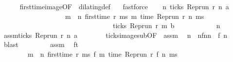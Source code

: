 \begin{isabellebody}
\ \ \ \ \isamarkupfalse%
\ first{\isacharunderscore}time{\isacharunderscore}image{\isacharbrackleft}OF\ {\isacharasterisk}{\isacharbrackright}\ dilating{\isacharunderscore}def\ {\isacharasterisk}\ \isamarkupfalse%
\ fastforce\isanewline
\ \ \isamarkupfalse%
\ {\isacartoucheopen}{\isasymforall}n{\isachardot}\ ticks\ {\isacharparenleft}{\isacharparenleft}Rep{\isacharunderscore}run\ r{\isacharparenright}\ n\ a{\isacharparenright}\isanewline
\ \ \ \ \ \ \ \ \ \ \ \ \ \ \ \ \ \ {\isasymlongrightarrow}\ {\isacharparenleft}{\isasymforall}m\ {\isasymge}\ n{\isachardot}\ first{\isacharunderscore}time\ r\ ms\ m\ {\isacharparenleft}time\ {\isacharparenleft}{\isacharparenleft}Rep{\isacharunderscore}run\ r{\isacharparenright}\ n\ ms{\isacharparenright}\ {\isacharplus}\ {\isasymdelta}{\isasymtau}{\isacharparenright}\isanewline
\ \ \ \ \ \ \ \ \ \ \ \ \ \ \ \ \ \ \ \ \ \ \ \ \ \ \ \ \ \ \ \ {\isasymlongrightarrow}\ ticks\ {\isacharparenleft}{\isacharparenleft}Rep{\isacharunderscore}run\ r{\isacharparenright}\ m\ b{\isacharparenright}{\isacharparenright}{\isacartoucheclose}\isanewline
\ \ \isamarkupfalse%
\ {\isacharminus}\isanewline
\ \ \ \ \isacommand{{\isacharbraceleft}}\isamarkupfalse%
\ \isamarkupfalse%
\ n\ \isamarkupfalse%
\ assm{\isacharcolon}{\isacartoucheopen}ticks\ {\isacharparenleft}{\isacharparenleft}Rep{\isacharunderscore}run\ r{\isacharparenright}\ n\ a{\isacharparenright}{\isacartoucheclose}\isanewline
\ \ \ \ \ \ \isamarkupfalse%
\ ticks{\isacharunderscore}image{\isacharunderscore}sub{\isacharbrackleft}OF\ {\isacharasterisk}\ assm{\isacharbrackright}\ \isamarkupfalse%
\ n\ \ nfn{}{\isacharcolon}{\isacartoucheopen}n\ {\isacharequal}\ f\ n\ \isamarkupfalse%
\ blast\isanewline
\ \ \ \ \ \ \isamarkupfalse%
\ {\isacharasterisk}{\isacharasterisk}\ assm\ \isamarkupfalse%
\ ft{}{\isacharcolon}\isanewline
\ \ \ \ \ \ \ \ {\isacartoucheopen}{\isacharparenleft}{\isasymforall}m\ {\isasymge}\ n\ first{\isacharunderscore}time\ r\ ms\ {\isacharparenleft}f\ m\ {\isacharparenleft}time\ {\isacharparenleft}{\isacharparenleft}Rep{\isacharunderscore}run\ r{\isacharparenright}\ {\isacharparenleft}f\ n\ ms{\isacharparenright}\ {\isacharplus}\ {\isasymdelta}{\isasymtau}{\isacharparenright}\isanewline

\end{isabellebody}
